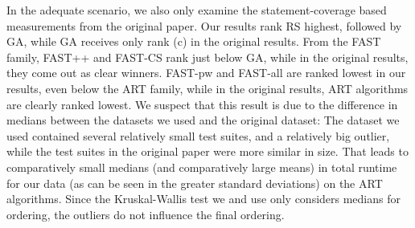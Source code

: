 In the adequate scenario, we also only examine the statement-coverage
based measurements from the original paper. Our results rank RS highest,
followed by GA, while GA receives only rank (c) in the original results.
From the FAST family, FAST++ and FAST-CS rank just below GA, while
in the original results, they come out as clear winners. FAST-pw and
FAST-all are ranked lowest in our results, even below the ART family,
while in the original results, ART algorithms are clearly ranked lowest.
We suspect that this result is due to the difference in medians between
the datasets we used and the original dataset: The dataset we used
contained several relatively small test suites, and a relatively big
outlier, while the test suites in the original paper were more similar
in size. That leads to comparatively small medians (and comparatively
large means) in total runtime for our data (as can be seen in the greater
standard deviations) on the ART algorithms. Since the Kruskal-Wallis
test we and \cite{cruciani2019scalable} use only considers medians for
ordering, the outliers do not influence the final ordering.

